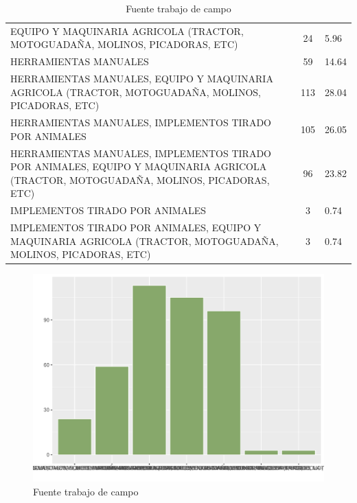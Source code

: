 \documentclass{article}\usepackage[]{graphicx}\usepackage[table]{xcolor}
\makeatletter
\def\maxwidth{ %
  \ifdim\Gin@nat@width>\linewidth
    \linewidth
  \else
    \Gin@nat@width
  \fi
}
\newenvironment{knitrout}{}{} %
\newenvironment{tablas}[2]
{\begin{table}[H]
		\centering
		\caption{#1}
		#2
		\caption*{Fuente trabajo de campo}}
	{\end{table}}
\newenvironment{fotos}[2]
{\begin{figure}[H]
	\centering
	\caption{#1}
	\texttt{[image: H:/Gore Cusco/Geragri/programa/analisis datos/fotos/\#2.jpg]}
	\caption*{Fuente: trabajo de campo}}
{\end{figure}}
\newenvironment{graficas}[2]
{\begin{figure}[H]
		\centering
		\caption{#1}
		#2
		\caption*{Fuente trabajo de campo}}
{\end{figure}}
\makeatother
\begin{document}
\begin{tablas}
{Insumos que usa para la produccion y cosecha}{

\begin{tabular}{lcl}
\toprule
\cellcolor[HTML]{87A96B}{\textcolor{black}{\textbf{Insumo}}} & \cellcolor[HTML]{87A96B}{\textcolor{black}{\textbf{Conteo}}} & \cellcolor[HTML]{87A96B}{\textcolor{black}{\textbf{Porcentaje}}}\\
\midrule
EQUIPO Y MAQUINARIA AGRICOLA (TRACTOR, MOTOGUADAÑA, MOLINOS, PICADORAS, ETC) & 24 & 5.96\\
HERRAMIENTAS MANUALES & 59 & 14.64\\
HERRAMIENTAS MANUALES, EQUIPO Y MAQUINARIA AGRICOLA (TRACTOR, MOTOGUADAÑA, MOLINOS, PICADORAS, ETC) & 113 & 28.04\\
HERRAMIENTAS MANUALES, IMPLEMENTOS TIRADO POR ANIMALES & 105 & 26.05\\
HERRAMIENTAS MANUALES, IMPLEMENTOS TIRADO POR ANIMALES, EQUIPO Y MAQUINARIA AGRICOLA (TRACTOR, MOTOGUADAÑA, MOLINOS, PICADORAS, ETC) & 96 & 23.82\\
\addlinespace
IMPLEMENTOS TIRADO POR ANIMALES & 3 & 0.74\\
IMPLEMENTOS TIRADO POR ANIMALES, EQUIPO Y MAQUINARIA AGRICOLA (TRACTOR, MOTOGUADAÑA, MOLINOS, PICADORAS, ETC) & 3 & 0.74\\
\bottomrule
\end{tabular}


}
\end{tablas}
\begin{graficas}
{Insumos que usa para la produccion y cosecha}{
\begin{knitrout}
\definecolor{shadecolor}{rgb}{0.969, 0.969, 0.969}\color{fgcolor}
\includegraphics[width=\maxwidth]{figure/fig_cuarentayuno-1} 
\end{knitrout}
}
\end{graficas}


\end{document}
